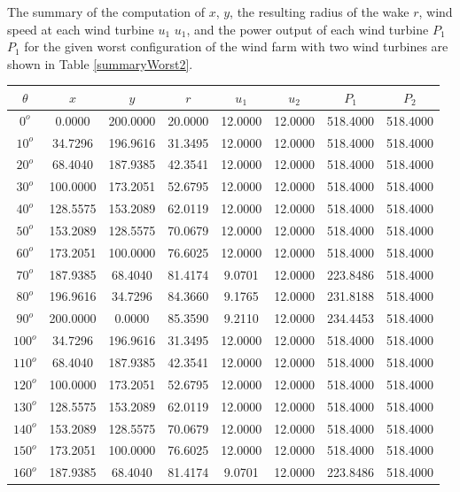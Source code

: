    The summary of the computation of $x$, $y$, the resulting radius of the wake $r$, wind speed at each wind turbine $u_1$ $u_1$, and the power output of each wind turbine $P_1$ $P_1$ for the given worst configuration of the wind farm with two wind turbines are shown in Table \ref{summaryWorst2}.
    
    \singlespacing
\begin{table}[H]
    \centering
    \begin{tabular}{|c|c|c|c|c|c|c|c|} \hline
$\theta$ &$x$ &$y$ &$r$ &$u_1$ &$u_2$ &$P_1$ &$P_2$ \\ \hline
$0^o$	&0.0000	&200.0000	&20.0000	&12.0000	&12.0000	&518.4000	&518.4000 \\ \hline
$10^o$	&34.7296	&196.9616	&31.3495	&12.0000	&12.0000	&518.4000	&518.4000 \\ \hline
$20^o$	&68.4040	&187.9385	&42.3541	&12.0000	&12.0000	&518.4000	&518.4000 \\ \hline
$30^o$	&100.0000	&173.2051	&52.6795	&12.0000	&12.0000	&518.4000	&518.4000 \\ \hline
$40^o$	&128.5575	&153.2089	&62.0119	&12.0000	&12.0000	&518.4000	&518.4000 \\ \hline
$50^o$	&153.2089	&128.5575	&70.0679	&12.0000	&12.0000	&518.4000	&518.4000 \\ \hline
$60^o$	&173.2051	&100.0000	&76.6025	&12.0000	&12.0000	&518.4000	&518.4000 \\ \hline
$70^o$	&187.9385	&68.4040	&81.4174	&9.0701	&12.0000	&223.8486	&518.4000 \\ \hline
$80^o$	&196.9616	&34.7296	&84.3660	&9.1765	&12.0000	&231.8188	&518.4000 \\ \hline
$90^o$	&200.0000	&0.0000	&85.3590	&9.2110	&12.0000	&234.4453	&518.4000 \\ \hline
$100^o$	&34.7296	&196.9616	&31.3495	&12.0000	&12.0000	&518.4000	&518.4000 \\ \hline
$110^o$	&68.4040	&187.9385	&42.3541	&12.0000	&12.0000	&518.4000	&518.4000 \\ \hline
$120^o$	&100.0000	&173.2051	&52.6795	&12.0000	&12.0000	&518.4000	&518.4000 \\ \hline
$130^o$	&128.5575	&153.2089	&62.0119	&12.0000	&12.0000	&518.4000	&518.4000 \\ \hline
$140^o$	&153.2089	&128.5575	&70.0679	&12.0000	&12.0000	&518.4000	&518.4000 \\ \hline
$150^o$	&173.2051	&100.0000	&76.6025	&12.0000	&12.0000	&518.4000	&518.4000 \\ \hline
$160^o$	&187.9385	&68.4040	&81.4174	&9.0701	&12.0000	&223.8486	&518.4000 \\ \hline

\end{tabular}
\end{table}
